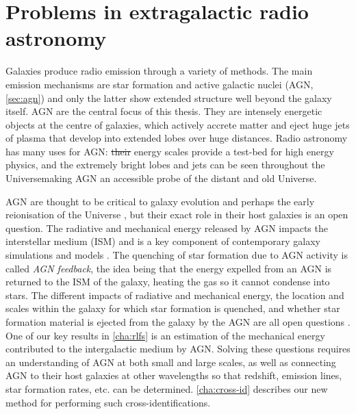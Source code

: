 \documentclass[11pt, a4paper]{book}
\newcommand{\defn}[1]{\emph{#1}}
\providecommand{\DIFaddtex}[1]{{\protect\color{blue}\uwave{#1}}} %
\providecommand{\DIFdeltex}[1]{{\protect\color{red}\sout{#1}}}                      %
\providecommand{\DIFaddbegin}{} %
\providecommand{\DIFaddend}{} %
\providecommand{\DIFdelbegin}{} %
\providecommand{\DIFdelend}{} %
\providecommand{\DIFadd}[1]{\texorpdfstring{\DIFaddtex{#1}}{#1}} %
\providecommand{\DIFdel}[1]{\texorpdfstring{\DIFdeltex{#1}}{}} %
\newcommand{\DIFscaledelfig}{0.5}
\newlength{\DIFdelgraphicswidth} %
\newlength{\DIFdelgraphicsheight} %
\newcommand{\DIFaddincludegraphics}[2][]{{\color{blue}\fbox{\DIFOincludegraphics[#1]{#2}}}} %
\newcommand{\DIFdelincludegraphics}[2][]{%
\sbox{\DIFdelgraphicsbox}{\DIFOincludegraphics[#1]{#2}}%
\settoboxwidth{\DIFdelgraphicswidth}{\DIFdelgraphicsbox} %
\settoboxtotalheight{\DIFdelgraphicsheight}{\DIFdelgraphicsbox} %
\scalebox{\DIFscaledelfig}{%
\parbox[b]{\DIFdelgraphicswidth}{\usebox{\DIFdelgraphicsbox}\\[-\baselineskip] \rule{\DIFdelgraphicswidth}{0em}}\llap{\resizebox{\DIFdelgraphicswidth}{\DIFdelgraphicsheight}{%
\setlength{\unitlength}{\DIFdelgraphicswidth}%
\begin{picture}(1,1)%
\thicklines\linethickness{2pt} %
{\color[rgb]{1,0,0}\put(0,0){\framebox(1,1){}}}%
{\color[rgb]{1,0,0}\put(0,0){\line( 1,1){1}}}%
{\color[rgb]{1,0,0}\put(0,1){\line(1,-1){1}}}%
\end{picture}%
}\hspace*{3pt}}} %
} %
\DeclareRobustCommand{\DIFaddbegin}{\DIFOaddbegin \let\includegraphics\DIFaddincludegraphics} %
\DeclareRobustCommand{\DIFaddend}{\DIFOaddend \let\includegraphics\DIFOincludegraphics} %
\DeclareRobustCommand{\DIFdelbegin}{\DIFOdelbegin \let\includegraphics\DIFdelincludegraphics} %
\DeclareRobustCommand{\DIFdelend}{\DIFOaddend \let\includegraphics\DIFOincludegraphics} %
\begin{document}
\section{Problems in extragalactic radio astronomy}
\label{sec:problems-radio-astronomy}

    Galaxies produce radio emission through a variety of methods. The main emission mechanisms are star formation and active galactic nuclei (AGN, \autoref{sec:agn}) and only the latter show extended structure well beyond the galaxy itself. AGN are the central focus of this thesis. They are intensely energetic objects at the centre of galaxies, which actively accrete matter and eject huge jets of plasma that develop into extended lobes over huge distances. Radio astronomy has many uses for AGN: \DIFdelbegin \DIFdel{their }\DIFdelend \DIFaddbegin \DIFadd{Their }\DIFaddend energy scales provide a test-bed for high energy physics, and the extremely bright lobes and jets can be seen throughout the Universe\DIFaddbegin \DIFadd{, }\DIFaddend making AGN an accessible probe of the distant and old Universe.

    AGN are thought to be critical to galaxy evolution and perhaps the early reionisation of the Universe \citep{bosch-ramon_role_2018}, but their exact role in their host galaxies is an open question. The radiative and mechanical energy released by AGN impacts the interstellar medium (ISM) and is a key component of contemporary galaxy simulations and models \citep{morganti_many_2017}. The quenching of star formation due to AGN activity is called \defn{AGN feedback}, the idea being that the energy expelled from an AGN is returned to the ISM of the galaxy, heating the gas so it cannot condense into stars. The different impacts of radiative and mechanical energy, the location and scales within the galaxy for which star formation is quenched, and whether star formation material is ejected from the galaxy by the AGN are all open questions \citep{husemann_reality_2018}. One of our key results in \autoref{cha:rlfs} is an estimation of the mechanical energy contributed to the intergalactic medium by AGN. Solving these questions requires an understanding of AGN at both small and large scales, as well as connecting AGN to their host galaxies at other wavelengths so that redshift, emission lines, star formation rates, etc. can be determined. \autoref{cha:cross-id} describes our new method for performing such cross-identifications.
\end{document}
